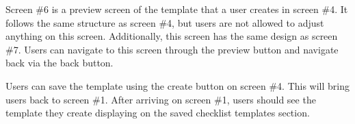 

Screen \#6 is a preview screen of the template that a user creates in screen \#4. It follows the same structure as screen \#4, but users are not allowed to adjust anything on this screen. Additionally, this screen has the same design as screen \#7. Users can navigate to this screen through the preview button and navigate back via the back button.

Users can save the template using the create button on screen \#4. This will bring users back to screen \#1. After arriving on screen \#1, users should see the template they create displaying on the saved checklist templates section.














